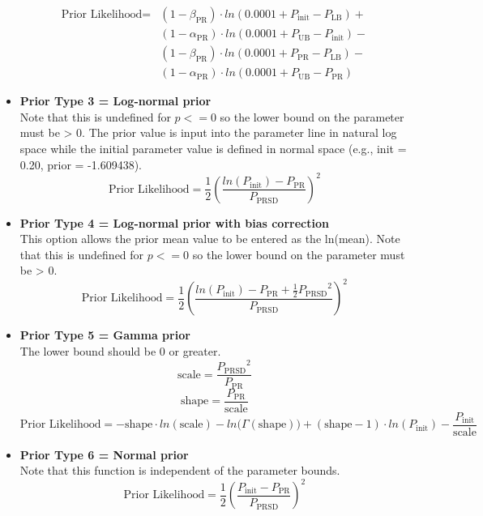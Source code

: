 \begin{itemize}
	\begin{equation}
		\begin{split}
\text{Prior Likelihood} = &(1 - \beta_\text{PR}) \cdot ln(0.0001 + P_\text{init} - P_\text{LB}) + \\
&(1 - \alpha_\text{PR}) \cdot ln(0.0001 + P_\text{UB} - P_\text{init}) - \\
&(1 - \beta_\text{PR}) \cdot ln(0.0001 + P_\text{PR} - P_\text{LB}) - \\
&(1 - \alpha_\text{PR}) \cdot ln(0.0001 + P_\text{UB} - P_\text{PR})
		\end{split}
	\end{equation}	

	
	\item \textbf{Prior Type 3 = Log-normal prior} \\ 
	Note that this is undefined for $p <= 0$ so the lower bound on the parameter must be > 0. The prior value is input into the parameter line in natural log space while the initial parameter value is defined in normal space (e.g., init = 0.20, prior = -1.609438).
	\begin{equation}
		\text{Prior Likelihood} = \frac{1}{2} \left(\frac{ln(P_\text{init})-P_\text{PR}}{P_\text{PRSD}}\right)^2
	\end{equation}
	
	\item \textbf{Prior Type 4 = Log-normal prior with bias correction} \\ 
	This option allows the prior mean value to be entered as the ln(mean). Note that this is undefined for $p <= 0$ so the lower bound on the parameter must be > 0.
	\begin{equation}
		\text{Prior Likelihood} = \frac{1}{2} \left(\frac{ln(P_\text{init})-P_\text{PR} + \frac{1}{2}{P_\text{PRSD}}^2}{P_\text{PRSD}}\right)^2
	\end{equation}
	
	\item \textbf{Prior Type 5 = Gamma prior} \\ 
	The lower bound should be 0 or greater.
	\begin{equation}
		\text{scale} = \frac{{P_\text{PRSD}}^2}{P_\text{PR}}
	\end{equation}
	\begin{equation}
		\text{shape} = \frac{P_\text{PR}}{\text{scale}}
	\end{equation}
	\begin{equation}
		\text{Prior Likelihood} = -\text{shape} \cdot ln(\text{scale}) - ln\big(\Gamma(\text{shape})\big) + (\text{shape} - 1) \cdot ln(P_\text{init}) - \frac{P_\text{init}}{\text{scale}}
	\end{equation}
	
	\item \textbf{Prior Type 6 = Normal prior} \\ 
	Note that this function is independent of the parameter bounds.
	\begin{equation}
		\text{Prior Likelihood} = \frac{1}{2} \left(\frac{P_\text{init} - P_\text{PR}}{P_\text{PRSD}}\right)^2
	\end{equation}
\end{itemize}



% 


\pagebreak
